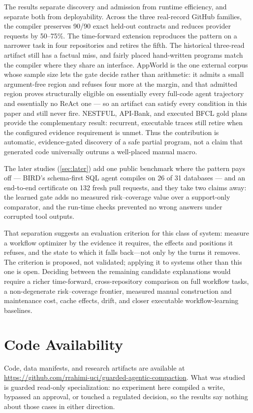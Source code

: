 The results separate discovery and admission from runtime efficiency, and separate both
from deployability. Across the three real-record GitHub families, the compiler preserves
90/90 exact held-out contracts and reduces provider requests by 50--75\%. The time-forward
extension reproduces the pattern on a narrower task in four repositories and retires the
fifth. The historical three-read artifact still has a factual miss, and fairly placed
hand-written programs match the compiler where they share an interface. AppWorld is the one
external corpus whose sample size lets the gate decide rather than arithmetic: it admits a
small argument-free region and refuses four more at the margin, and that admitted region
proves structurally eligible on essentially every full-code agent trajectory and
essentially no ReAct one --- so an artifact can satisfy every condition in this paper and
still never fire. NESTFUL, API-Bank, and executed BFCL gold plans provide the complementary
result: recurrent, executable traces still retire when the configured evidence requirement
is unmet. Thus the contribution is automatic, evidence-gated discovery of a safe partial
program, not a claim that generated code universally outruns a well-placed manual macro.

The later studies (\cref{sec:later}) add one public benchmark where the pattern pays
off --- BIRD's schema-first SQL agent compiles on 26 of 31 databases --- and an end-to-end
certificate on 132 fresh pull requests, and they take two claims away: the learned gate
adds no measured risk--coverage value over a support-only comparator, and the run-time
checks prevented no wrong answers under corrupted tool outputs.

That separation suggests an evaluation criterion for this class of system: measure a
workflow optimizer by the evidence it requires, the effects and positions it refuses, and
the state to which it falls back---not only by the turns it removes. The criterion is
proposed, not validated; applying it to systems other than this one is open. Deciding
between the remaining candidate explanations would require a richer time-forward,
cross-repository comparison on full workflow tasks, a non-degenerate risk--coverage
frontier, measured manual construction and maintenance cost, cache effects, drift, and
closer executable workflow-learning baselines.

\section*{Code Availability}

Code, data manifests, and research artifacts are available at
\url{https://github.com/rrahimi-uci/guarded-agentic-compaction}.  What was studied is
guarded read-only specialization: no experiment here compiled a write, bypassed an
approval, or touched a regulated decision, so the results say nothing about those cases in
either direction.
